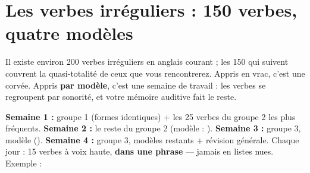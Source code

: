 \chapter{Les verbes irréguliers : 150 verbes, quatre modèles}

Il existe environ 200 verbes irréguliers en anglais courant ; les 150 qui suivent couvrent la quasi-totalité de ceux que vous rencontrerez. Appris en vrac, c'est une
corvée. Appris \textbf{par modèle}, c'est une semaine de travail : les verbes se regroupent
par sonorité, et votre mémoire auditive fait le reste.

\begin{memo}
\textbf{Semaine 1 :} groupe 1 (formes identiques) + les 25 verbes du groupe 2 les plus
fréquents. \textbf{Semaine 2 :} le reste du groupe 2 (modèle  : ). \textbf{Semaine 3 :} groupe 3, modèle  \ra {} \ra {}
(). \textbf{Semaine 4 :} groupe 3, modèles restants + révision
générale. Chaque jour : 15 verbes à voix haute, \textbf{dans une phrase} --- jamais en
listes nues. Exemple : 
\end{memo}

